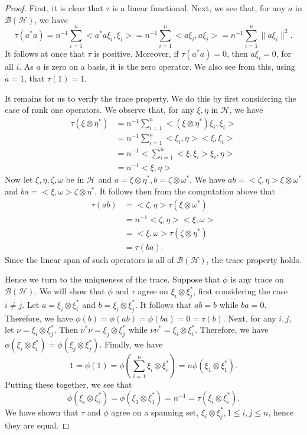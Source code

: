 \documentclass{book}
\begin{document}
\begin{proof}
  First, it is clear that \(\tau\) is a linear functional. Next, we see that, for
  any \(a\) in \(\mathcal{B}(\mathcal{H})\), we have
  \[
  \tau(a^*a)=n^{-1}\sum_{i=1}^n <a^*a\xi_i,\xi_i > = n^{-1}\sum_{i=1}^{n} < a\xi_i,a\xi_i >  
  = n^{-1} \sum_{i=1}^n \|a\xi_i\|^2.
  \]
  It follows at once that \(\tau\) is positive. Moreover, if \(\tau(a^*a) = 0\), then \(a\xi_i = 0\),
  for all \(i\). As \(a\) is zero on a basis, it is the zero operator. We also see from
  this, using \(a = 1\), that \(\tau(1) = 1\).\par
  It remains for us to verify the trace property. We do this by first considering 
  the case of rank one operators. We observe that, for any \(\xi,\eta\) in \(\mathcal{H}\), we
  have
  \begin{align*}
    \tau(\xi \otimes \eta^*) &= n^{-1}\sum_{i=1}^n <(\xi \otimes \eta^*)\xi_i,\xi_i >\\
    &= n^{-1}\sum_{i=1}^n<\xi_i,\eta >< \xi,\xi_i >\\
    &= n^{-1}<\sum_{i=1}^n<\xi,\xi_i>\xi_i,\eta>\\
    &=n^{-1}<\xi,\eta>
  \end{align*}
  Now let \(\xi,\eta,\zeta,\omega\) be in \(\mathcal{H}\) and \(a = \xi \otimes\eta^*,b = \zeta \otimes\omega^*\). 
  We have \(ab =< \zeta,\eta> \xi \otimes\omega^*\) 
  and \(ba =< \xi,\omega >\zeta \otimes\eta^*\). It follows then from the computation above
  that
  \begin{align*}
    \tau(ab) &= <\zeta,\eta >\tau(\xi\otimes\omega^*)\\
    &= n^{-1} <\zeta,\eta ><\xi,\omega >\\
    &= <\xi,\omega>\tau(\zeta\otimes\eta^*)\\
    &= \tau(ba).
  \end{align*}
  Since the linear span of such operators is all of \(\mathcal{B}(\mathcal{H})\), the trace property holds.\par
  Hence we turn to the uniqueness of the trace. Suppose that \(\phi\) is any
  trace on \(\mathcal{B}(\mathcal{H})\). We will show that \(\phi\) and \(\tau\) agree on \(\xi_i \otimes\xi_j^*\), 
  first considering
  the case \(i\neq j\). Let \(a = \xi_i \otimes\xi^*_i\) and \(b = \xi_i \otimes\xi^*_j\). It follows that \(ab = b\) while
  \(ba = 0\). Therefore, we have \(\phi(b) = \phi(ab) = \phi(ba) = 0 = \tau(b)\). Next, for any
  \(i, j\), let \(\nu = \xi_i \otimes\xi^*_j\). Then \(\nu^*\nu = \xi_j \otimes\xi^*_j\) 
  while \(\nu\nu^* = \xi_i \otimes\xi^*_i\). Therefore, we
  have \(\phi(\xi_i \otimes\xi^*_i) = \phi(\xi_j \otimes\xi^*_j)\). Finally, we have
  \[
  1 =\phi(1) = \phi \left( \sum_{i=1}^{n}\xi_i \otimes \xi_i^* \right)= n\phi(\xi_1 \otimes \xi^*_1).
  \]
  Putting these together, we see that
  \[
  \phi(\xi_i \otimes \xi^*_i) = \phi(\xi_1 \otimes \xi^*_1) = n^{-1} = \tau(\xi_i \otimes\xi^*_i).
  \]
  We have shown that \(\tau\) and \(\phi\) agree on a spanning set, \(\xi_i \otimes \xi^*_j,1 \leq i,j \leq n\),
  hence they are equal.
\end{proof}
\end{document}
